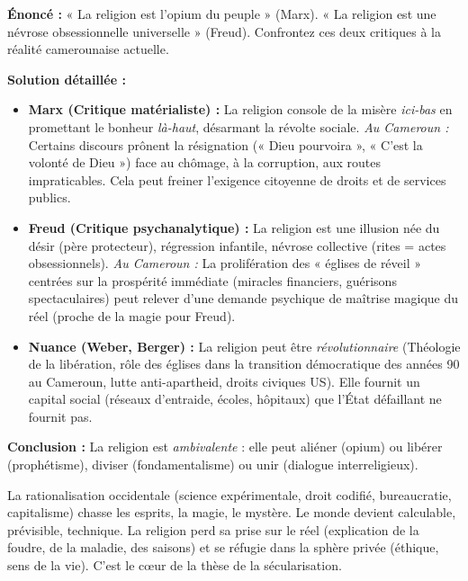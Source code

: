 \documentclass[11pt]{article}
\newcommand{\cle}[1]{{\popxbold\color{popdark}#1}}
\begin{document}
\begin{exoresolu}
\textbf{Énoncé :} « La religion est l'opium du peuple » (Marx). « La religion est une névrose obsessionnelle universelle » (Freud). Confrontez ces deux critiques à la réalité camerounaise actuelle.

\textbf{Solution détaillée :}
\begin{itemize}
    \item \textbf{Marx (Critique matérialiste) :} La religion console de la misère \emph{ici-bas} en promettant le bonheur \emph{là-haut}, désarmant la révolte sociale. \emph{Au Cameroun :} Certains discours prônent la résignation (« Dieu pourvoira », « C'est la volonté de Dieu ») face au chômage, à la corruption, aux routes impraticables. Cela peut freiner l'exigence citoyenne de droits et de services publics.
    \item \textbf{Freud (Critique psychanalytique) :} La religion est une illusion née du désir (père protecteur), régression infantile, névrose collective (rites = actes obsessionnels). \emph{Au Cameroun :} La prolifération des « églises de réveil » centrées sur la prospérité immédiate (miracles financiers, guérisons spectaculaires) peut relever d'une demande psychique de maîtrise magique du réel (proche de la magie pour Freud).
    \item \textbf{Nuance (Weber, Berger) :} La religion peut être \emph{révolutionnaire} (Théologie de la libération, rôle des églises dans la transition démocratique des années 90 au Cameroun, lutte anti-apartheid, droits civiques US). Elle fournit un \cle{capital social} (réseaux d'entraide, écoles, hôpitaux) que l'État défaillant ne fournit pas.
\end{itemize}
\textbf{Conclusion :} La religion est \emph{ambivalente} : elle peut aliéner (opium) ou libérer (prophétisme), diviser (fondamentalisme) ou unir (dialogue interreligieux).
\end{exoresolu}

\begin{propriete}
La rationalisation occidentale (science expérimentale, droit codifié, bureaucratie, capitalisme) chasse les esprits, la magie, le mystère. Le monde devient \cle{calculable}, \cle{prévisible}, \cle{technique}. La religion perd sa prise sur le réel (explication de la foudre, de la maladie, des saisons) et se réfugie dans la sphère privée (éthique, sens de la vie). C'est le cœur de la thèse de la \cle{sécularisation}.
\end{propriete}
\end{document}
